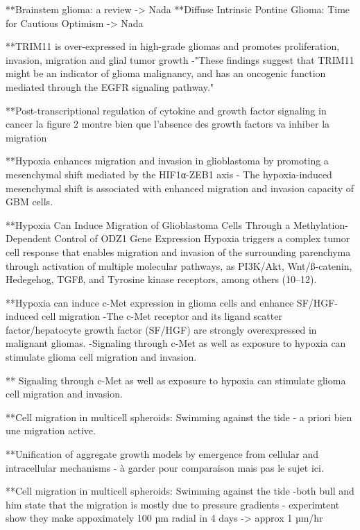 \documentclass[11pt,a4paper]{article}
\begin{document}
**Brainstem glioma: a review -> Nada
**Diffuse Intrinsic Pontine Glioma: Time for Cautious Optimism -> Nada

**TRIM11 is over-expressed in high-grade gliomas and promotes proliferation, invasion, migration and glial tumor growth
 -"These findings suggest that TRIM11 might be an indicator of glioma malignancy, and has an oncogenic function mediated through the EGFR signaling pathway."
 
**Post-transcriptional regulation of cytokine and growth factor signaling in cancer
la figure 2 montre bien que l'absence des growth factors va inhiber la migration

**Hypoxia enhances migration and invasion in glioblastoma by promoting a mesenchymal shift mediated by the HIF1α-ZEB1 axis
- The hypoxia-induced mesenchymal shift is associated with enhanced migration and invasion capacity of GBM cells.

**Hypoxia Can Induce Migration of Glioblastoma Cells Through a Methylation-Dependent Control of ODZ1 Gene Expression
Hypoxia triggers a complex tumor cell response that enables migration and invasion of the surrounding parenchyma through activation of multiple molecular pathways, as PI3K/Akt, Wnt/ß-catenin, Hedegehog, TGFß, and Tyrosine kinase receptors, among others (10–12).

**Hypoxia can induce c-Met expression in glioma cells and enhance
SF/HGF-induced cell migration
-The c-Met receptor and its ligand scatter factor/hepatocyte
growth factor (SF/HGF) are strongly overexpressed in malignant
gliomas.
-Signaling through c-Met as well as exposure to hypoxia
can stimulate glioma cell migration and invasion.

** Signaling through c-Met as well as exposure to hypoxia
can stimulate glioma cell migration and invasion.

**Cell migration in multicell spheroids: Swimming against the tide
- a priori bien une migration active.

**Unification of aggregate growth models by emergence from cellular and intracellular mechanisms 
- à garder pour comparaison mais pas le sujet ici.

**Cell migration in multicell spheroids: Swimming against the tide
-both bull and him state that the migration is mostly due to pressure gradients
- experimtent show they make appoximately 100 µm radial in 4 days -> approx 1 µm/hr
\end{document}
